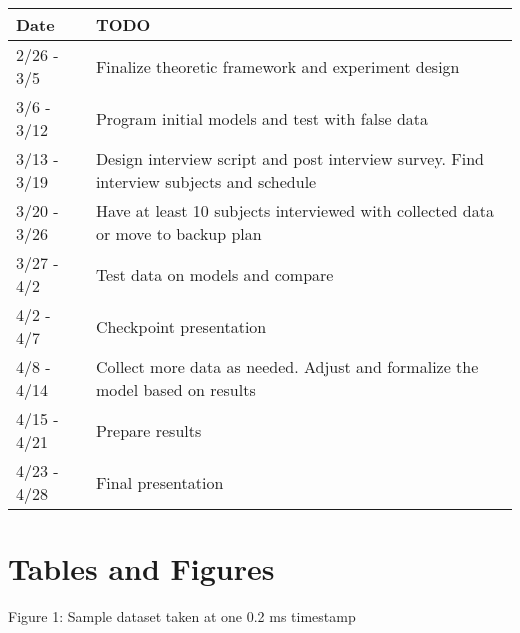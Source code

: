 \documentclass[12pt,letterpaper]{article}
\begin{document}
\begin{center}
\begin{tabular}{ l | p{8cm} }
\bf{Date} & \bf{TODO} \\ \hline
2/26 - 3/5 & Finalize theoretic framework and experiment design\\
3/6 - 3/12 & Program initial models and test with false data\\
3/13 - 3/19 & Design interview script and post interview survey. Find interview subjects and schedule\\
3/20 - 3/26 & Have at least 10 subjects interviewed with collected data or move to backup plan\\
3/27 - 4/2 & Test data on models and compare\\
4/2 - 4/7 & Checkpoint presentation\\
4/8 - 4/14 & Collect more data as needed. Adjust and formalize the model based on results\\
4/15 - 4/21 & Prepare results\\
4/23 - 4/28 & Final presentation
\end{tabular}
\end{center}

\section{Tables and Figures}
\begin{center} Figure 1: Sample dataset taken at one 0.2 ms timestamp \end{center}


\end{document}
